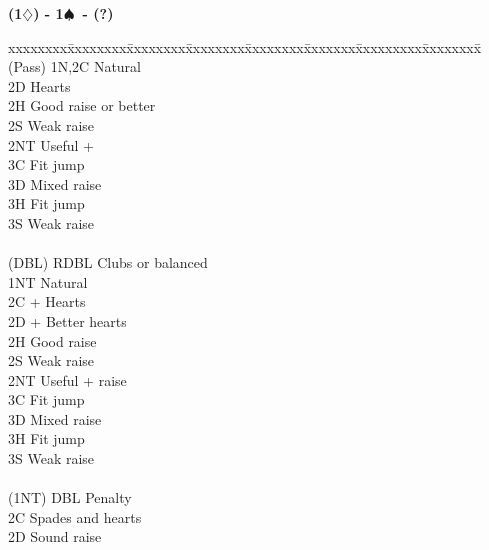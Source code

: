 \documentclass[10pt]{article}
\renewcommand{\d}{$\diamondsuit$}
\newcommand{\s}{$\spadesuit$}
\newcommand{\x}{DBL}
\newenvironment{bidtable}[1][]
{\textbf{#1}
  \begin{adjustwidth}{1em}{}
    \addvspace{2pt}
    \begin{tabbing}
      xxxxxxxx\=xxxxxxxx\=xxxxxxxx\=xxxxxxxx\=xxxxxxxx\=xxxxxxx\=xxxxxxxxx\=xxxxxxxx\=\kill}
{\end{tabbing}\end{adjustwidth}\bigskip}%
\begin{document}
\begin{bidtable}[(1\d) - 1\s\ - (?)]
(Pass) \> 1N,2C \> Natural                                 \\
       \> 2D    \> Hearts                                  \\
       \> 2H    \> Good raise or better                    \\
       \> 2S    \> Weak raise                              \\
       \> 2NT   \> Useful +                                \\
       \> 3C    \> Fit jump                                \\
       \> 3D    \> Mixed raise                             \\
       \> 3H    \> Fit jump                                \\
       \> 3S    \> Weak raise                              \\
                                                           \\
(\x)   \> RDBL  \> Clubs or balanced                       \\
       \> 1NT   \> Natural                                 \\
       \> 2C    + Hearts                               \\
       \> 2D    + Better hearts                        \\
       \> 2H    \> Good raise                              \\
       \> 2S    \> Weak raise                              \\
       \> 2NT   \> Useful + raise                          \\
       \> 3C    \> Fit jump                                \\
       \> 3D    \> Mixed raise                             \\
       \> 3H    \> Fit jump                                \\
       \> 3S    \> Weak raise                              \\
                                                           \\
(1NT)  \> DBL   \> Penalty                                 \\
       \> 2C    \> Spades and hearts                       \\
       \> 2D    \> Sound raise                             \\

\end{bidtable}
\end{document}
